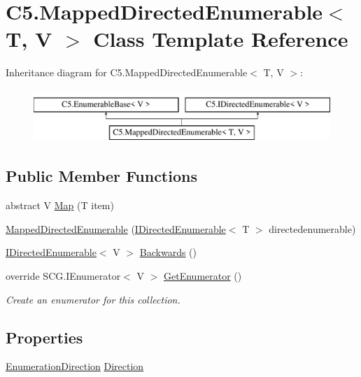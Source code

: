 \hypertarget{class_c5_1_1_mapped_directed_enumerable}{}\section{C5.\+Mapped\+Directed\+Enumerable$<$ T, V $>$ Class Template Reference}
\label{class_c5_1_1_mapped_directed_enumerable}
Inheritance diagram for C5.\+Mapped\+Directed\+Enumerable$<$ T, V $>$\+:\begin{figure}[H]
\begin{center}
\leavevmode
\includegraphics[height=2.000000cm]{class_c5_1_1_mapped_directed_enumerable}
\end{center}
\end{figure}
\subsection*{Public Member Functions}
\begin{DoxyCompactItemize}
\item 
abstract V \hyperlink{class_c5_1_1_mapped_directed_enumerable_a2681700ddad05c84129306e914074690}{Map} (T item)
\item 
\hyperlink{class_c5_1_1_mapped_directed_enumerable_adcb4efa54fadde1d4ae212cd005b2820}{Mapped\+Directed\+Enumerable} (\hyperlink{interface_c5_1_1_i_directed_enumerable}{I\+Directed\+Enumerable}$<$ T $>$ directedenumerable)
\item 
\hyperlink{interface_c5_1_1_i_directed_enumerable}{I\+Directed\+Enumerable}$<$ V $>$ \hyperlink{class_c5_1_1_mapped_directed_enumerable_a3edf8edd8136c499761fed7ead5ba33a}{Backwards} ()
\item 
override S\+C\+G.\+I\+Enumerator$<$ V $>$ \hyperlink{class_c5_1_1_mapped_directed_enumerable_a20cbeb4a43b678a5d3d4f6d0c3e5497b}{Get\+Enumerator} ()
\begin{DoxyCompactList}\small\item\em Create an enumerator for this collection. \end{DoxyCompactList}\end{DoxyCompactItemize}
\subsection*{Properties}
\begin{DoxyCompactItemize}
\item 
\hyperlink{namespace_c5_aad282676794e49130eb8caed289395f8}{Enumeration\+Direction} \hyperlink{class_c5_1_1_mapped_directed_enumerable_a5bd5299651d33dd9788e043ee487350b}{Direction}
\end{DoxyCompactItemize}
